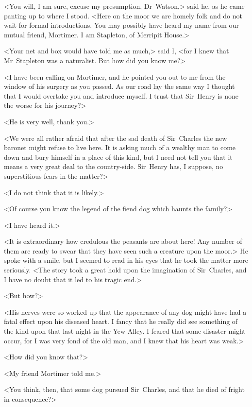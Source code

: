 <You will, I am sure, excuse my presumption, Dr~Watson,> said he, as he came panting up to where I stood. <Here on the moor we are homely folk and do not wait for formal introductions. You may possibly have heard my name from our mutual friend, Mortimer. I am Stapleton, of Merripit House.>

<Your net and box would have told me as much,> said I, <for I knew that Mr~Stapleton was a naturalist. But how did you know me?>

<I have been calling on Mortimer, and he pointed you out to me from the window of his surgery as you passed. As our road lay the same way I thought that I would overtake you and introduce myself. I trust that Sir~Henry is none the worse for his journey?>

<He is very well, thank you.>

<We were all rather afraid that after the sad death of Sir~Charles the new baronet might refuse to live here. It is asking much of a wealthy man to come down and bury himself in a place of this kind, but I need not tell you that it means a very great deal to the country-side. Sir~Henry has, I suppose, no superstitious fears in the matter?>

<I do not think that it is likely.>

<Of course you know the legend of the fiend dog which haunts the family?>

<I have heard it.>

<It is extraordinary how credulous the peasants are about here! Any number of them are ready to swear that they have seen such a creature upon the moor.> He spoke with a smile, but I seemed to read in his eyes that he took the matter more seriously. <The story took a great hold upon the imagination of Sir~Charles, and I have no doubt that it led to his tragic end.>

<But how?>

<His nerves were so worked up that the appearance of any dog might have had a fatal effect upon his diseased heart. I fancy that he really did see something of the kind upon that last night in the Yew Alley. I feared that some disaster might occur, for I was very fond of the old man, and I knew that his heart was weak.>

<How did you know that?>

<My friend Mortimer told me.>

<You think, then, that some dog pursued Sir~Charles, and that he died of fright in consequence?>

